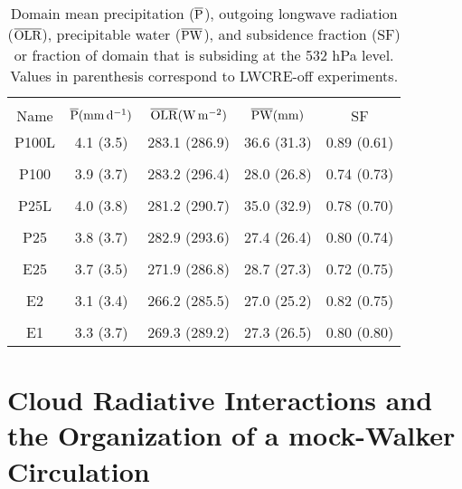 \documentclass[draft]{agujournal2019}
\begin{document}
\begin{table}
\begin{center}
\caption{Domain mean precipitation ($\overline{\rm{P}}$), outgoing longwave radiation 
($\overline{\rm{OLR}}$), precipitable water ($\overline{\rm{PW}}$), and subsidence fraction (SF)  
or fraction of domain that is subsiding at the 532 hPa level.
Values in parenthesis correspond to LWCRE-off experiments.}
    \begin{tabular}{*{5}{c}}
    \hline
    \hline
    \\
 Name &   $\overline{\rm{P}} (\mathrm{mm \,d^{-1}})$ & $\overline{\rm{OLR}} (\rm{W \, m^{-2}})$ & $\overline{\rm{PW}} (\rm{mm})$ & SF   \\ \hline
  P100L   &  4.1 (3.5)   &  283.1 (286.9)  & 36.6 (31.3)  & 0.89 (0.61)      \\ 
    \\
  P100 &   3.9 (3.7)   &  283.2 (296.4)  & 28.0 (26.8) & 0.74 (0.73)           \\  
    \\
  P25L &   4.0 (3.8)  &  281.2 (290.7)   & 35.0 (32.9) & 0.78 (0.70)          \\  
    \\
  P25  &   3.8 (3.7)    & 282.9 (293.6)   & 27.4 (26.4) & 0.80 (0.74)          \\  
    \\
 E25  & 3.7 (3.5)    &   271.9 (286.8)   & 28.7 (27.3) & 0.72 (0.75)            \\  
    \\
 E2   &  3.1 (3.4)   &  266.2 (285.5)    & 27.0 (25.2) & 0.82 (0.75)           \\ 
    \\
 E1   &  3.3 (3.7)   &  269.3 (289.2)    & 27.3 (26.5) & 0.80 (0.80)         \\  \hline

    \end{tabular}\par
    \label{tab:experimentmeans}
\end{center}
\end{table}



\section{Cloud Radiative Interactions and the Organization of a mock-Walker Circulation}
\end{document}
